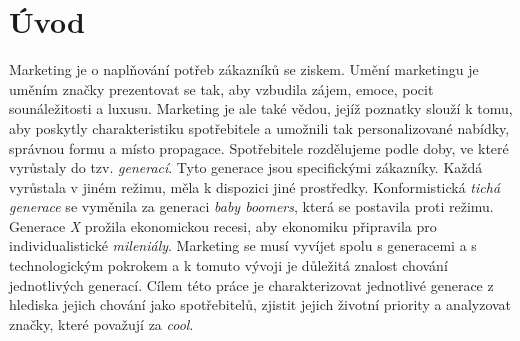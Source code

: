 \chapter*{Úvod}

Marketing je o naplňování potřeb zákazníků se ziskem. Umění marketingu je uměním značky prezentovat se tak, aby vzbudila zájem, emoce, pocit sounáležitosti a luxusu. Marketing je ale také vědou, jejíž poznatky slouží k tomu, aby poskytly charakteristiku spotřebitele a umožnili tak personalizované nabídky, správnou formu a místo propagace.
Spotřebitele rozdělujeme podle doby, ve které vyrůstaly do tzv. \textit{generací}. Tyto generace jsou specifickými zákazníky. Každá vyrůstala v jiném režimu, měla k dispozici jiné prostředky. Konformistická \textit{tichá generace} se vyměnila za generaci \textit{baby boomers}, která se postavila proti režimu. Generace \textit{X} prožila ekonomickou recesi, aby ekonomiku připravila pro individualistické \textit{mileniály}. Marketing se musí vyvíjet spolu s generacemi a s technologickým pokrokem a k tomuto vývoji je důležitá znalost chování jednotlivých generací. Cílem této práce je charakterizovat jednotlivé generace z hlediska jejich chování jako spotřebitelů, zjistit jejich životní priority a analyzovat značky, které považují za \textit{cool}.